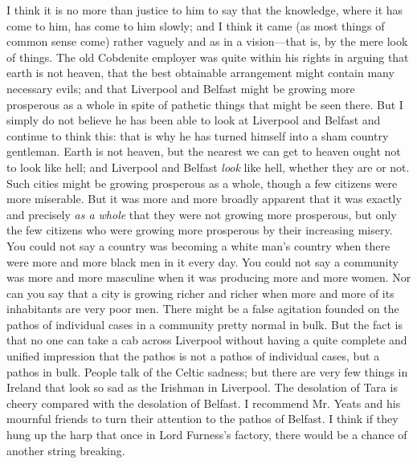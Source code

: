 \documentclass{book}
\begin{document}
I think it is no more than justice to him to say that the knowledge, where it has come to him, has come to him slowly; and I think it came (as most things of common sense come) rather vaguely and as in a vision—that is, by the mere look of things. The old Cobdenite employer was quite within his rights in arguing that earth is not heaven, that the best obtainable arrangement might contain many necessary evils; and that Liverpool and Belfast might be growing more prosperous as a whole in spite of pathetic things that might be seen there. But I simply do not believe he has been able to look at Liverpool and Belfast and continue to think this: that is why he has turned himself into a sham country gentleman. Earth is not heaven, but the nearest we can get to heaven ought not to look like hell; and Liverpool and Belfast \emph{look} like hell, whether they are or not. Such cities might be growing prosperous as a whole, though a few citizens were more miserable. But it was more and more broadly apparent that it was exactly and precisely \emph{as a whole} that they were not growing more prosperous, but only the few citizens who were growing more prosperous by their increasing misery. You could not say a country was becoming a white man’s country when there were more and more black men in it every day. You could not say a community was more and more masculine when it was producing more and more women. Nor can you say that a city is growing richer and richer when more and more of its inhabitants are very poor men. There might be a false agitation founded on the pathos of individual cases in a community pretty normal in bulk. But the fact is that no one can take a cab across Liverpool without having a quite complete and unified impression that the pathos is not a pathos of individual cases, but a pathos in bulk. People talk of the Celtic sadness; but there are very few things in Ireland that look so sad as the Irishman in Liverpool. The desolation of Tara is cheery compared with the desolation of Belfast. I recommend Mr. Yeats and his mournful friends to turn their attention to the pathos of Belfast. I think if they hung up the harp that once in Lord Furness’s factory, there would be a chance of another string breaking.
\end{document}
